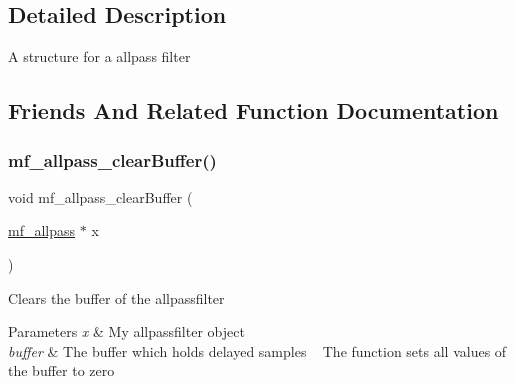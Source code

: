 \subsection{Detailed Description}
A structure for a allpass filter ~\newline
 

\subsection{Friends And Related Function Documentation}
\mbox{\label{structmf__allpass_a38aaea521b618aabcfdbe4b27f7da14b}} 
\subsubsection{\texorpdfstring{mf\+\_\+allpass\+\_\+clear\+Buffer()}{mf\_allpass\_clearBuffer()}}
{\footnotesize\ttfamily void mf\+\_\+allpass\+\_\+clear\+Buffer (\begin{DoxyParamCaption}\item[{\mbox{\hyperlink{structmf__allpass}{mf\+\_\+allpass}} $\ast$}]{x }\end{DoxyParamCaption})\hspace{0.3cm}{\ttfamily [related]}}



Clears the buffer of the allpassfilter~\newline
 


\begin{DoxyParams}{Parameters}
{\em x} & My allpassfilter object ~\newline
 \\
\hline
{\em buffer} & The buffer which holds delayed samples ~\newline
 The function sets all values of the buffer to zero ~\newline
 \\
\hline
\end{DoxyParams}
\mbox{\label{structmf__allpass_a36b0067cba49f41dccbff7c2ecc155f1}} 
